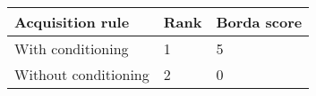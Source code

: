 \begin{tabular}{lll}
Acquisition rule & Rank & Borda score \\ 
\hline 
With conditioning & 1 & 5 \\ 
Without conditioning & 2 & 0 \\ 
\hline 
\end{tabular}